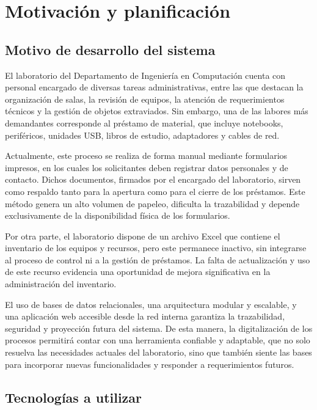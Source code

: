\section{Motivación y planificación}

\subsection{Motivo de desarrollo del sistema}

El laboratorio del Departamento de Ingeniería en Computación cuenta con personal encargado de 
diversas tareas administrativas, entre las que destacan la organización de salas, la revisión 
de equipos, la atención de requerimientos técnicos y la gestión de objetos extraviados. Sin 
embargo, una de las labores más demandantes corresponde al préstamo de material, que incluye 
notebooks, periféricos, unidades USB, libros de estudio, adaptadores y cables de red.

Actualmente, este proceso se realiza de forma manual mediante formularios impresos, en los 
cuales los solicitantes deben registrar datos personales y de contacto. Dichos documentos, 
firmados por el encargado del laboratorio, sirven como respaldo tanto para la apertura como 
para el cierre de los préstamos. Este método genera un alto volumen de papeleo, dificulta la 
trazabilidad y depende exclusivamente de la disponibilidad física de los formularios.

Por otra parte, el laboratorio dispone de un archivo Excel que contiene el inventario de los 
equipos y recursos, pero este permanece inactivo, sin integrarse al proceso de control ni a 
la gestión de préstamos. La falta de actualización y uso de este recurso evidencia una 
oportunidad de mejora significativa en la administración del inventario.

El uso de bases de datos relacionales, una arquitectura modular y escalable, y una aplicación 
web accesible desde la red interna garantiza la trazabilidad, seguridad y proyección futura 
del sistema. De esta manera, la digitalización de los procesos permitirá contar con una 
herramienta confiable y adaptable, que no solo resuelva las necesidades actuales del 
laboratorio, sino que también siente las bases para incorporar nuevas funcionalidades y 
responder a requerimientos futuros.

\subsection{Tecnologías a utilizar}

